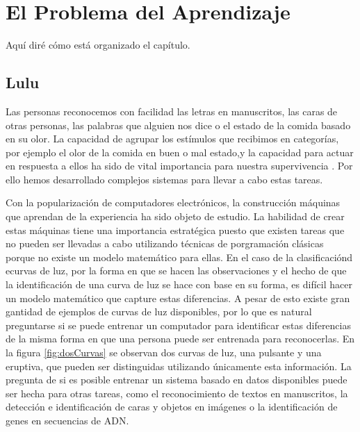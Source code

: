 \documentclass[letterpaper,12pt]{book}
\begin{document}
\chapter{El Problema del Aprendizaje}

Aquí diré cómo está organizado el capítulo.

\section{Lulu}

Las personas reconocemos con facilidad las letras en manuscritos, las caras de otras personas, las palabras que alguien nos dice o el estado de la comida basado en su olor. La capacidad de agrupar los estímulos que recibimos en categorías, por ejemplo el olor de la comida en buen o mal estado,y la capacidad para actuar en respuesta a ellos ha sido de vital importancia para nuestra supervivencia . Por ello  hemos desarrollado complejos sistemas para llevar a cabo estas tareas. 

Con la popularización de computadores electrónicos, la construcción máquinas que aprendan de la experiencia ha sido objeto de estudio. La habilidad de crear estas máquinas tiene una importancia estratégica puesto que existen tareas que no pueden ser llevadas a cabo utilizando técnicas de porgramación clásicas porque no existe un modelo matemático para ellas. En el caso de la clasificaciónd ecurvas de luz, por la forma en que se hacen las observaciones y el hecho de que la identificación de una curva de luz se hace con base en su forma, es difícil hacer un modelo matemático que capture estas diferencias. A pesar de esto existe gran gantidad de ejemplos de curvas de luz disponibles, por lo que es natural preguntarse si se puede entrenar un computador para identificar estas diferencias de la misma forma en que una persona puede ser entrenada para reconocerlas. En la figura \ref{fig:dosCurvas} se observan dos curvas de luz, una pulsante y una eruptiva, que pueden ser distinguidas utilizando únicamente esta información. La pregunta de si es posible entrenar un sistema basado en datos disponibles puede ser hecha para otras tareas, como el reconocimiento de textos en manuscritos, la detección e identificación de caras y objetos en imágenes o la identificación de genes en secuencias de ADN. 
\end{document}
